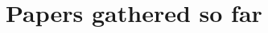 \documentclass[a4paper]{article}
\begin{document}
\section{Papers gathered so far}
\nocite{*}


\end{document}
